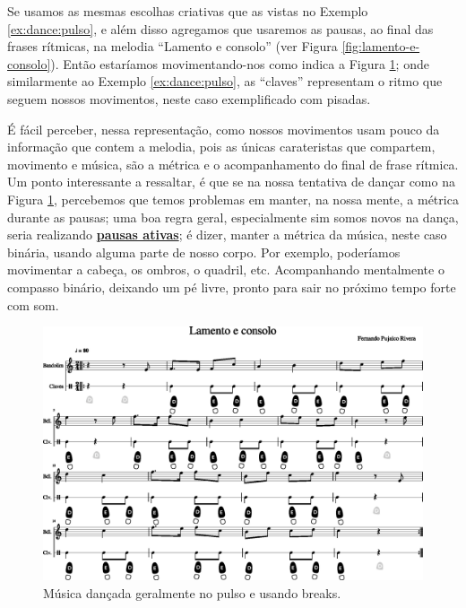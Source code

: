 \begin{example}
Se usamos as mesmas escolhas criativas que as vistas no Exemplo \ref{ex:dance:pulso},
e além disso agregamos que usaremos as pausas, ao final das frases rítmicas,
 na melodia ``Lamento e consolo'' (ver Figura \ref{fig:lamento-e-consolo}). 
Então estaríamos movimentando-nos como indica a Figura \ref{fig:lamentoconsolopulsobreak1};
onde similarmente ao Exemplo \ref{ex:dance:pulso},
as ``claves'' representam o ritmo que seguem nossos movimentos,
neste caso exemplificado com pisadas.

É fácil perceber, nessa representação, 
como nossos movimentos usam pouco da informação que contem a melodia, 
pois as únicas carateristas que compartem, movimento e música, 
são a métrica e o acompanhamento do final de frase rítmica.
Um ponto interessante a ressaltar,
 é que se na nossa tentativa de dançar como na Figura \ref{fig:lamentoconsolopulsobreak1}, 
percebemos que temos problemas em manter, na nossa mente, a métrica durante as pausas; 
uma boa regra geral, especialmente sim somos novos na dança, 
seria realizando \hyperref[ref:pausaativa]{\textbf{pausas ativas}};
é dizer, manter a métrica da música, neste caso binária, usando alguma parte de nosso corpo.
Por exemplo, poderíamos movimentar a cabeça, os ombros, o quadril, etc.
Acompanhando mentalmente o compasso binário,
deixando um pé livre, pronto para sair no próximo tempo forte com som.
\end{example}
\begin{figure}
    \centering
    \includegraphics[width=\textwidth]{chapters/cap-musicalidade-tecnica/lamento-e-consolo-clave-pulso+break-1.eps}
    \caption{Música dançada geralmente no pulso e usando breaks.}
    \label{fig:lamentoconsolopulsobreak1}
\end{figure}

